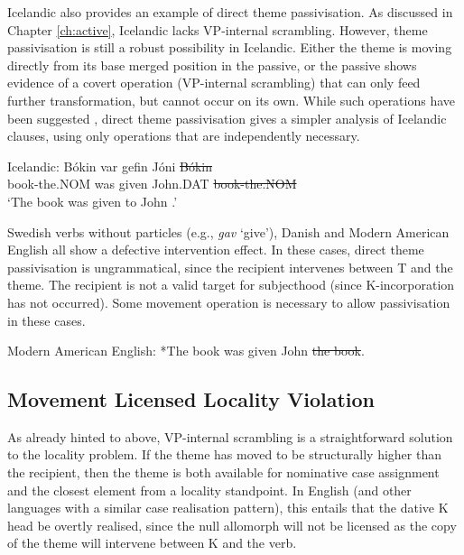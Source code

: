 Icelandic also provides an example of direct theme passivisation. As discussed in Chapter \ref{ch:active}, Icelandic lacks VP-internal scrambling. However, theme passivisation is still a robust possibility in Icelandic. Either the theme is moving directly from its base merged position in the passive, or the passive shows evidence of a covert operation (VP-internal scrambling) that can only feed further transformation, but cannot occur on its own. While such operations have been suggested \citep[119ff]{Richards.2001}, direct theme passivisation gives a simpler analysis of Icelandic clauses, using only operations that are independently necessary.

\begin{exe}
\ex Icelandic:
\gll B\'{o}kin var gefin J\'{o}ni \sout{B\'{o}kin}\\
book-the.NOM was given John.DAT \sout{book-the.NOM}\\
\trans `The book was given to John \citep{Holmberg.1995,Bardal.2001}.'
\end{exe}

Swedish verbs without particles (e.g., \textit{gav} `give'), Danish and Modern American English all show a defective intervention effect. In these cases, direct theme passivisation is ungrammatical, since the recipient intervenes between T and the theme. The recipient is not a valid target for subjecthood (since K-incorporation has not occurred). Some movement operation is necessary to allow passivisation in these cases.

\begin{exe}
	\ex Modern American English: *The book was given John \sout{the book}.
\end{exe}

\subsection{Movement Licensed Locality Violation}
As already hinted to above, VP-internal scrambling is a straightforward solution to the locality problem. If the theme has moved to be structurally higher than the recipient, then the theme is both available for nominative case assignment and the closest element from a locality standpoint. In English (and other languages with a similar case realisation pattern), this entails that the dative K head be overtly realised, since the null allomorph will not be licensed as the copy of the theme will intervene between K and the verb.

